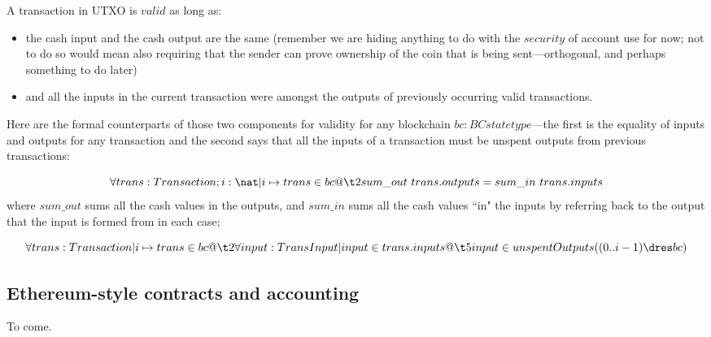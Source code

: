 \documentclass[11pt]{amsart}
\begin{document}
A transaction in UTXO is $valid$ as long as:
\begin{itemize}
\item
 the cash input and the cash output are the same (remember we are hiding anything to do with the $security$ of account use for now; not to do so would mean also requiring that the sender can prove ownership of the coin that is being sent---orthogonal, and perhaps something to do later)
 \item
  and all the inputs in the current transaction were amongst the outputs of previously occurring valid transactions.
\end{itemize}

Here are the formal counterparts of those two components for validity for any blockchain $bc : BCstatetype$---the first is the equality of inputs and outputs for any transaction and the second says that all the inputs of a transaction must be unspent outputs from previous transactions:

\[
\forall trans : Transaction; i : \nat | i \mapsto trans \in bc @\\
          \t2 sum\_out\ trans.outputs = sum\_in\  trans.inputs
\]
where $sum\_out$ sums all the cash values in the outputs, and $sum\_in$ sums all the cash values ``in" the inputs by referring back to the output that the input is formed from in each case;

\[
\forall trans : Transaction | i \mapsto trans \in  bc @\\
         \t2 \forall input : TransInput | input \in trans.inputs @ \\
                     \t5input \in unspentOutputs ((0..i-1) \dres bc)
\]


\subsection{Ethereum-style contracts and accounting}

To come.
\end{document}
